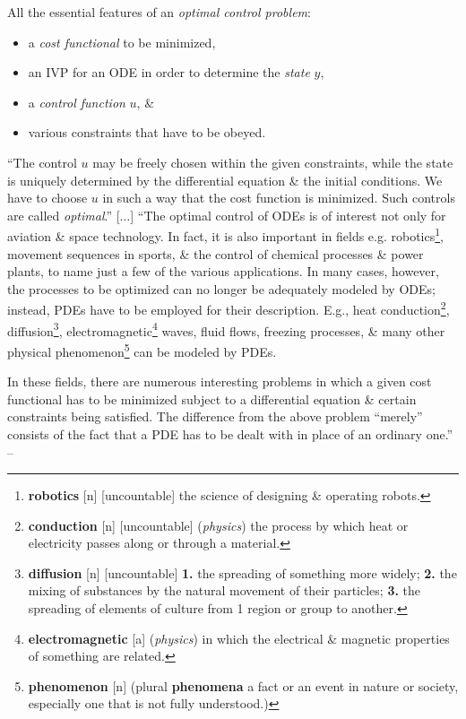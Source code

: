 \documentclass[oneside]{book}
\numberwithin{equation}{section}
\begin{document}
All the essential features of an \textit{optimal control problem}:
\begin{itemize}
	\item a \textit{cost functional} to be minimized,
	\item an IVP for an ODE in order to determine the \textit{state} $y$,
	\item a \textit{control function} $u$, \&
	\item various constraints that have to be obeyed.
\end{itemize}
``The control $u$ may be freely chosen within the given constraints, while the state is uniquely determined by the differential equation \& the initial conditions. We have to choose $u$ in such a way that the cost function is minimized. Such controls are called \textit{optimal}.'' [$\ldots$] ``The optimal control of ODEs is of interest not only for aviation \& space technology. In fact, it is also important in fields e.g. robotics\footnote{\textbf{robotics} [n] [uncountable] the science of designing \& operating robots.}, movement sequences in sports, \& the control of chemical processes \& power plants, to name just a few of the various applications. In many cases, however, the processes to be optimized can no longer be adequately modeled by ODEs; instead, PDEs have to be employed for their description. E.g., heat conduction\footnote{\textbf{conduction} [n] [uncountable] (\textit{physics}) the process by which heat or electricity passes along or through a material.}, diffusion\footnote{\textbf{diffusion} [n] [uncountable] \textbf{1.} the spreading of something more widely; \textbf{2.} the mixing of substances by the natural movement of their particles; \textbf{3.} the spreading of elements of culture from 1 region or group to another.}, electromagnetic\footnote{\textbf{electromagnetic} [a] (\textit{physics}) in which the electrical \& magnetic properties of something are related.} waves, fluid flows, freezing processes, \& many other physical phenomenon\footnote{\textbf{phenomenon} [n] (plural \textbf{phenomena} a fact or an event in nature or society, especially one that is not fully understood.)} can be modeled by PDEs.

In these fields, there are numerous interesting problems in which a given cost functional has to be minimized subject to a differential equation \& certain constraints being satisfied. The difference from the above problem ``merely'' consists of the fact that a PDE has to be dealt with in place of an ordinary one.'' -- \cite[pp. 2--3]{Troltzsch2010}
\end{document}
